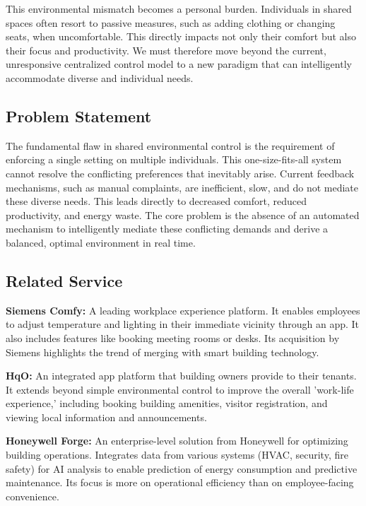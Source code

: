\documentclass[conference]{IEEEtran}
\begin{document}
This environmental mismatch becomes a personal burden. Individuals in shared spaces often resort to passive measures, such as adding clothing or changing seats, when uncomfortable. This directly impacts not only their comfort but also their focus and productivity. We must therefore move beyond the current, unresponsive centralized control model to a new paradigm that can intelligently accommodate diverse and individual needs.

\subsection{Problem Statement}
The fundamental flaw in shared environmental control is the requirement of enforcing a single setting on multiple individuals. This one-size-fits-all system cannot resolve the conflicting preferences that inevitably arise. Current feedback mechanisms, such as manual complaints, are inefficient, slow, and do not mediate these diverse needs. This leads directly to decreased comfort, reduced productivity, and energy waste. The core problem is the absence of an automated mechanism to intelligently mediate these conflicting demands and derive a balanced, optimal environment in real time.

\subsection{Related Service}

    \textbf{Siemens Comfy:} A leading workplace experience platform. It enables employees to adjust temperature and lighting in their immediate vicinity through an app. It also includes features like booking meeting rooms or desks. Its acquisition by Siemens highlights the trend of merging with smart building technology.

\vspace{\baselineskip}

    \textbf{HqO:} An integrated app platform that building owners provide to their tenants. It extends beyond simple environmental control to improve the overall 'work-life experience,' including booking building amenities, visitor registration, and viewing local information and announcements.

\vspace{\baselineskip}

    \textbf{Honeywell Forge:} An enterprise-level solution from Honeywell for optimizing building operations. Integrates data from various systems (HVAC, security, fire safety) for AI analysis to enable prediction of energy consumption and predictive maintenance. Its focus is more on operational efficiency than on employee-facing convenience.
\end{document}
